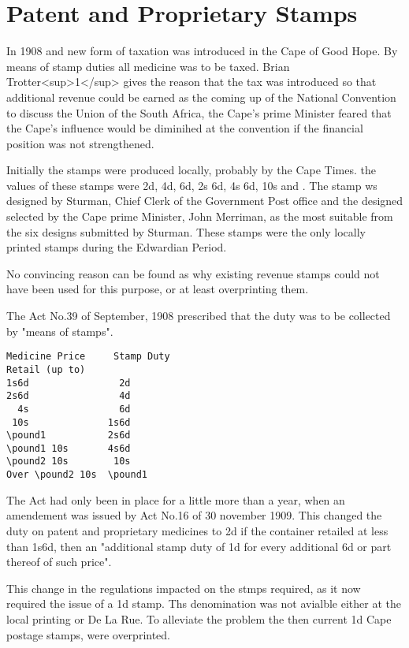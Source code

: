 \chapter{Patent and Proprietary Stamps} 

In 1908 and new form of taxation was introduced in the Cape of Good Hope. By means of stamp duties all medicine was to be taxed. Brian Trotter<sup>1</sup> gives the reason that the tax was introduced so that additional revenue could be earned as the coming up of the National Convention to discuss the Union of the South Africa, the Cape's prime Minister feared that the Cape's influence would be diminihed at the convention if the financial position was not strengthened.

Initially the stamps were produced locally, probably by the Cape Times. the values of these stamps were 2d, 4d, 6d, 2s 6d, 4s 6d, 10s and . The stamp ws designed by Sturman, Chief Clerk of the Government Post office and the designed selected by the Cape prime Minister, John Merriman, as the most suitable from the six designs submitted by Sturman. These stamps were the only locally printed stamps during the Edwardian Period.

No convincing reason can be found as why existing revenue stamps could not have been used for this purpose, or at least overprinting them.



The Act No.39 of September, 1908 prescribed that the duty was to be collected by
"means of stamps".

\begin{verbatim}
Medicine Price     Stamp Duty
Retail (up to)
1s6d				2d
2s6d				4d
  4s				6d
 10s 			  1s6d	
\pound1           2s6d 
\pound1 10s       4s6d
\pound2 10s        10s
Over \pound2 10s  \pound1
\end{verbatim}

The Act had only been in place for a little more than a year, when an amendement was issued
by Act No.16 of 30 november 1909. This changed the duty on patent and proprietary medicines to 2d if the container retailed at less than 1s6d, then an "additional stamp duty of 1d for every additional 6d or part thereof of such price".

This change in the regulations impacted on the stmps required, as it now required the
issue of a 1d stamp. Ths denomination was not avialble either at the local printing or De La Rue. To alleviate the problem the then current 1d Cape postage stamps, were overprinted.

